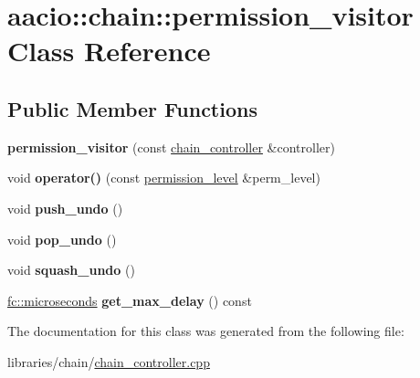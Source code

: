 \hypertarget{classaacio_1_1chain_1_1permission__visitor}{}\section{aacio\+:\+:chain\+:\+:permission\+\_\+visitor Class Reference}
\label{classaacio_1_1chain_1_1permission__visitor}
\subsection*{Public Member Functions}
\begin{DoxyCompactItemize}
\item 
\mbox{\label{classaacio_1_1chain_1_1permission__visitor_a2f759b86f880c3c7feed349a596dc179}} 
{\bfseries permission\+\_\+visitor} (const \mbox{\hyperlink{classaacio_1_1chain_1_1chain__controller}{chain\+\_\+controller}} \&controller)
\item 
\mbox{\label{classaacio_1_1chain_1_1permission__visitor_abc935439cf49b2763e84da253a9d24c1}} 
void {\bfseries operator()} (const \mbox{\hyperlink{structaacio_1_1chain_1_1permission__level}{permission\+\_\+level}} \&perm\+\_\+level)
\item 
\mbox{\label{classaacio_1_1chain_1_1permission__visitor_a67e291535b9b051d27ab63fd1ac6b6ba}} 
void {\bfseries push\+\_\+undo} ()
\item 
\mbox{\label{classaacio_1_1chain_1_1permission__visitor_a1a24204c35ce0152ce1de46180852cd1}} 
void {\bfseries pop\+\_\+undo} ()
\item 
\mbox{\label{classaacio_1_1chain_1_1permission__visitor_a78ec061d101e94a0c8a9f87be4e27e67}} 
void {\bfseries squash\+\_\+undo} ()
\item 
\mbox{\label{classaacio_1_1chain_1_1permission__visitor_a2f6b4e8a7a995fede2ad0a5d3a10dc77}} 
\mbox{\hyperlink{classfc_1_1microseconds}{fc\+::microseconds}} {\bfseries get\+\_\+max\+\_\+delay} () const
\end{DoxyCompactItemize}


The documentation for this class was generated from the following file\+:\begin{DoxyCompactItemize}
\item 
libraries/chain/\mbox{\hyperlink{chain__controller_8cpp}{chain\+\_\+controller.\+cpp}}\end{DoxyCompactItemize}
